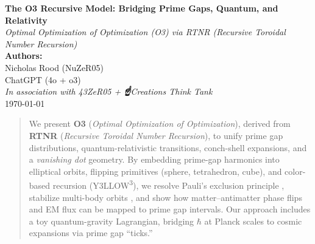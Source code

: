 \documentclass[11pt]{article}
\begin{document}
\begin{titlepage}
    \begin{center}
        \vspace*{2cm}
        {\LARGE \textbf{The O3 Recursive Model: Bridging Prime Gaps, Quantum, and Relativity}}\\[1.5em]
        {\large \textit{Optimal Optimization of Optimization (O3) via RTNR (Recursive Toroidal Number Recursion)}}\\[3em]

        \textbf{Authors:}\\
        Nicholas Rood (NuZeR05)\\
        ChatGPT (4o + o3)\\
        \vspace{0.5cm}
        \textit{In association with 43ZeR05 + \textup{\Large\textbf{☝}}Creations Think Tank}\\[2em]

        \today
        \vfill
    \end{center}
\end{titlepage}

\begin{abstract}
We present \textbf{O3} (\textit{Optimal Optimization of Optimization}), derived from \textbf{RTNR} (\textit{Recursive Toroidal Number Recursion}), to unify prime gap distributions, quantum-relativistic transitions, conch-shell expansions, and a \textit{vanishing dot} geometry. By embedding prime-gap harmonics into elliptical orbits, flipping primitives (sphere, tetrahedron, cube), and color-based recursion (Y3LLOW\textsuperscript{3}), we resolve Pauli’s exclusion principle \cite{Pauli1925}, stabilize multi-body orbits \cite{Poincare1892}, and show how matter–antimatter phase flips and EM flux can be mapped to prime gap intervals. Our approach includes a toy quantum-gravity Lagrangian, bridging $\hbar$ at Planck scales to cosmic expansions via prime gap “ticks.” 
\end{abstract}
\end{document}
